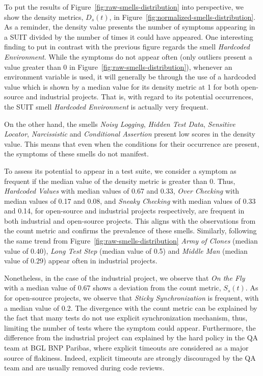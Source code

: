 To put the results of Figure~\ref{fig:raw-smells-distribution} into perspective, we show the density metrics, $D_s(t)$, in Figure~\ref{fig:normalized-smells-distribution}. As a reminder, the density value presents the number of symptoms appearing in a SUIT divided by the number of times it could have appeared. One interesting finding to put in contrast with the previous figure regards the smell \emph{Hardcoded Environment}. While the symptoms do not appear often (only outliers present a value greater than 0 in Figure~\ref{fig:raw-smells-distribution}), whenever an environment variable is used, it will generally be through the use of a hardcoded value which is shown by a median value for its density metric at 1 for both open-source and industrial projects. That is, with regard to its potential occurrences, the SUIT smell \emph{Hardcoded Environment} is actually very frequent.

On the other hand, the smells \emph{Noisy Logging}, \emph{Hidden Test Data}, \emph{Sensitive Locator}, \emph{Narcissistic} and \emph{Conditional Assertion} present low scores in the density value. This means that even when the conditions for their occurrence are present, the symptoms  of these smells do not manifest.


To assess its potential to appear in a test suite, we consider a symptom as frequent if the median value of the density metric is greater than 0. Thus, \emph{Hardcoded Values} with median values of 0.67 and 0.33, \emph{Over Checking} with median values of 0.17 and 0.08, and \emph{Sneaky Checking} with median values of 0.33 and 0.14, for open-source and industrial projects respectively, are frequent in both industrial and open-source projects. This aligns with the observations from  the count metric and confirms the prevalence of these smells. Similarly, following the same trend from Figure~\ref{fig:raw-smells-distribution} \emph{Army of Clones} (median value of 0.40), \emph{Long Test Step} (median value of 0.5) and \emph{Middle Man} (median value of 0.29) appear often in industrial projects.

Nonetheless, in the case of the industrial project, we observe that \emph{On the Fly} with a median value of 0.67 shows a deviation from the count metric, $S_s(t)$. 
As for open-source projects, we observe that \emph{Sticky Synchronization} is frequent, with a median value of 0.2. The divergence with the count metric can be explained by the fact that many tests do not use explicit synchronization mechanism, thus, limiting the number of tests where the symptom could appear. Furthermore, the difference from the industrial project can explained by the hard policy in the QA team at BGL BNP Paribas, where explicit timeouts are considered as a major source of flakiness. Indeed, explicit timeouts are strongly discouraged by the QA team and are usually removed during code reviews.

